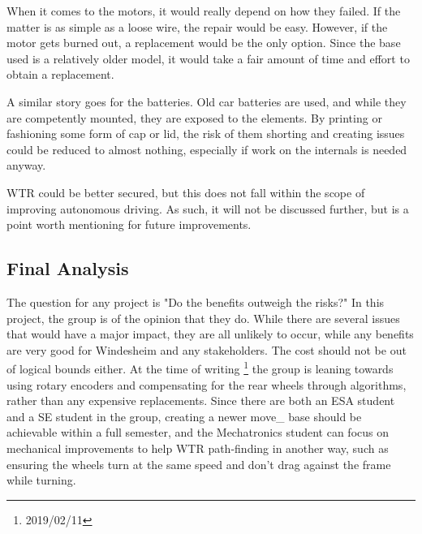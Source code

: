 When it comes to the motors, it would really depend on how they failed.
If the matter is as simple as a loose wire, the repair would be easy.
However, if the motor gets burned out, a replacement would be the only option.
Since the base used is a relatively older model, it would take a fair amount of time and effort to obtain a replacement.

A similar story goes for the batteries.
Old car batteries are used, and while they are competently mounted, they are exposed to the elements.
By printing or fashioning some form of cap or lid, the risk of them shorting and creating issues could be reduced to almost nothing, especially if work on the internals is needed anyway.

WTR could be better secured, but this does not fall within the scope of improving autonomous driving.
As such, it will not be discussed further, but is a point worth mentioning for future improvements.

\subsection{Final Analysis}
The question for any project is "Do the benefits outweigh the risks?"
In this project, the group is of the opinion that they do.
While there are several issues that would have a major impact, they are all unlikely to occur, while any benefits are very good for Windesheim and any stakeholders.
The cost should not be out of logical bounds either.
At the time of writing \footnote{2019/02/11} the group is leaning towards using rotary encoders and compensating for the rear wheels through algorithms, rather than any expensive replacements.
Since there are both an ESA student and a SE student in the group, creating a newer move\_ base should be achievable within a full semester, and the Mechatronics student can focus on mechanical improvements to help WTR path-finding in another way, such as ensuring the wheels turn at the same speed and don't drag against the frame while turning.

\newpage